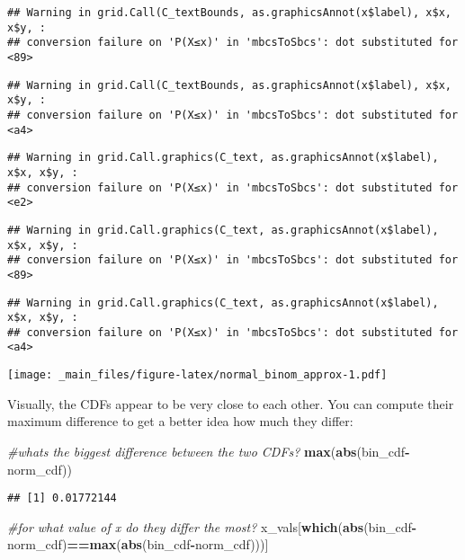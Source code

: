 \documentclass[
]{book}
\newenvironment{Shaded}{\begin{snugshade}}{\end{snugshade}}
\newcommand{\CommentTok}[1]{\textcolor[rgb]{0.56,0.35,0.01}{\textit{#1}}}
\newcommand{\FunctionTok}[1]{\textcolor[rgb]{0.13,0.29,0.53}{\textbf{#1}}}
\newcommand{\NormalTok}[1]{#1}
\newcommand{\SpecialCharTok}[1]{\textcolor[rgb]{0.81,0.36,0.00}{\textbf{#1}}}
\begin{document}
\begin{verbatim}
## Warning in grid.Call(C_textBounds, as.graphicsAnnot(x$label), x$x, x$y, :
## conversion failure on 'P(X≤x)' in 'mbcsToSbcs': dot substituted for <89>
\end{verbatim}

\begin{verbatim}
## Warning in grid.Call(C_textBounds, as.graphicsAnnot(x$label), x$x, x$y, :
## conversion failure on 'P(X≤x)' in 'mbcsToSbcs': dot substituted for <a4>
\end{verbatim}

\begin{verbatim}
## Warning in grid.Call.graphics(C_text, as.graphicsAnnot(x$label), x$x, x$y, :
## conversion failure on 'P(X≤x)' in 'mbcsToSbcs': dot substituted for <e2>
\end{verbatim}

\begin{verbatim}
## Warning in grid.Call.graphics(C_text, as.graphicsAnnot(x$label), x$x, x$y, :
## conversion failure on 'P(X≤x)' in 'mbcsToSbcs': dot substituted for <89>
\end{verbatim}

\begin{verbatim}
## Warning in grid.Call.graphics(C_text, as.graphicsAnnot(x$label), x$x, x$y, :
## conversion failure on 'P(X≤x)' in 'mbcsToSbcs': dot substituted for <a4>
\end{verbatim}

\texttt{[image: \_main\_files/figure-latex/normal\_binom\_approx-1.pdf]}

Visually, the CDFs appear to be very close to each other. You can compute their maximum difference to get a better idea how much they differ:

\begin{Shaded}
\begin{Highlighting}[]
\CommentTok{\#what\textquotesingle{}s the biggest difference between the two CDFs?}
\FunctionTok{max}\NormalTok{(}\FunctionTok{abs}\NormalTok{(bin\_cdf}\SpecialCharTok{{-}}\NormalTok{norm\_cdf))}
\end{Highlighting}
\end{Shaded}

\begin{verbatim}
## [1] 0.01772144
\end{verbatim}

\begin{Shaded}
\begin{Highlighting}[]
\CommentTok{\#for what value of x do they differ the most?}
\NormalTok{x\_vals[}\FunctionTok{which}\NormalTok{(}\FunctionTok{abs}\NormalTok{(bin\_cdf}\SpecialCharTok{{-}}\NormalTok{norm\_cdf)}\SpecialCharTok{==}\FunctionTok{max}\NormalTok{(}\FunctionTok{abs}\NormalTok{(bin\_cdf}\SpecialCharTok{{-}}\NormalTok{norm\_cdf)))]}
\end{Highlighting}
\end{Shaded}
\end{document}
